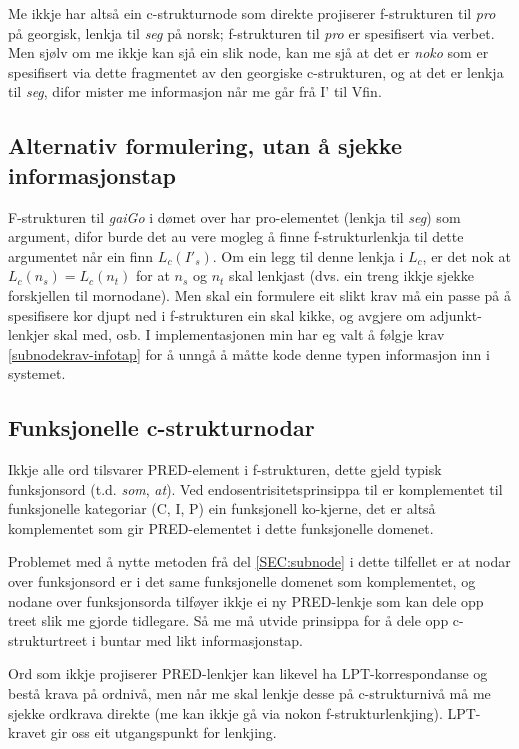 \documentclass[11pt,a4paper,oneside,draft]{book}
\begin{document}
Me ikkje har altså ein c-strukturnode som direkte projiserer
f-strukturen til \emph{pro} på georgisk, lenkja til \emph{seg} på norsk;
f-strukturen til \emph{pro} er spesifisert via verbet. Men sjølv om me
ikkje kan sjå ein slik node, kan me sjå at det er \emph{noko} som er
spesifisert via dette fragmentet av den georgiske c-strukturen, og at
det er lenkja til \emph{seg}, difor mister me informasjon når me går frå I'
til Vfin.

\subsection{Alternativ formulering, utan å sjekke informasjonstap}
\label{sec-3.7.1}

F-strukturen til \emph{gaiGo} i dømet over har pro-elementet (lenkja til
\emph{seg}) som argument, difor burde det au vere mogleg å finne
f-strukturlenkja til dette argumentet når ein finn $L_c(I'_s)$. Om ein
legg til denne lenkja i $L_c$, er det nok at $L_c(n_s)=L_c(n_t)$ for
at $n_s$ og $n_t$ skal lenkjast (dvs. ein treng ikkje sjekke
forskjellen til mornodane). Men skal ein formulere eit slikt krav må
ein passe på å spesifisere kor djupt ned i f-strukturen ein skal
kikke, og avgjere om adjunkt-lenkjer skal med, osb. I implementasjonen
min har eg valt å følgje krav \ref{subnodekrav-infotap} for å unngå å
måtte kode denne typen informasjon inn i systemet.

\subsection{Funksjonelle c-strukturnodar}
\label{sec-3.7.2}

\label{SEC:fnord}

Ikkje alle ord tilsvarer PRED-element i f-strukturen, dette gjeld
typisk funksjonsord (t.d. \emph{som}, \emph{at}). Ved endosentrisitetsprinsippa
til \citet{bresnan2001lfs} er komplementet til funksjonelle kategoriar
(C, I, P) ein funksjonell ko-kjerne, det er altså komplementet som gir
PRED-elementet i dette funksjonelle domenet.

Problemet med å nytte metoden frå del \ref{SEC:subnode} i dette
tilfellet er at nodar over funksjonsord er i det same funksjonelle
domenet som komplementet, og nodane over funksjonsorda tilføyer ikkje
ei ny PRED-lenkje som kan dele opp treet slik me gjorde tidlegare. Så
me må utvide prinsippa for å dele opp c-strukturtreet i buntar med
likt informasjonstap.

Ord som ikkje projiserer PRED-lenkjer kan likevel ha
LPT-korrespondanse og bestå krava på ordnivå, men når me skal lenkje
desse på c-strukturnivå må me sjekke ordkrava direkte (me kan ikkje gå
via nokon f-strukturlenkjing). LPT-kravet gir oss eit utgangspunkt for
lenkjing.
\end{document}
